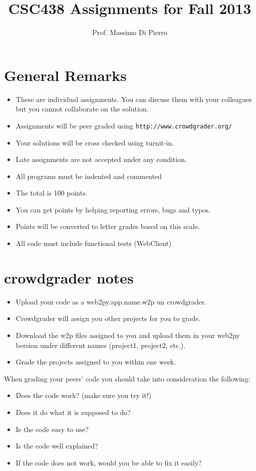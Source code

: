 \documentclass[12pt]{article}
\title{CSC438 Assignments for Fall 2013}
\author{Prof. Massimo Di Pierro}
\begin{document}
\maketitle

\section*{General Remarks}

\begin{itemize}
\item These are individual assignments. You can discuss them with your colleagues but you cannot collaborate on the solution.
\item Assignments will be peer graded using {\tt http://www.crowdgrader.org/}
\item Your solutions will be cross checked using turnit-in.
\item Late assignments are not accepted under any condition.
\item All programs must be indented and commented
\item The total is 100 points.
\item You can get points by helping reporting errors, bugs and typos.
\item Points will be converted to letter grades based on this scale.
\item All code must include functional tests (WebClient)
\end{itemize}

\section*{crowdgrader notes}
\begin{itemize}
\item Upload your code as a web2py.app.name.w2p un crowdgrader.
\item Crowdgrader will assign you other projects for you to grade.
\item Download the w2p files assigned to you and upload them in your web2py bersion under different names (project1, project2, etc.).
\item Grade the projects assigned to you within one week.
\end{itemize}

When grading your peers' code you should take into consideration the following:
\begin{itemize}
\item Does the code work? (make sure you try it!)
\item Does it do what it is supposed to do?
\item Is the code easy to use?
\item Is the code well explained?
\item If the code does not work, would you be able to fix it easily?
\end{itemize}
\end{document}
